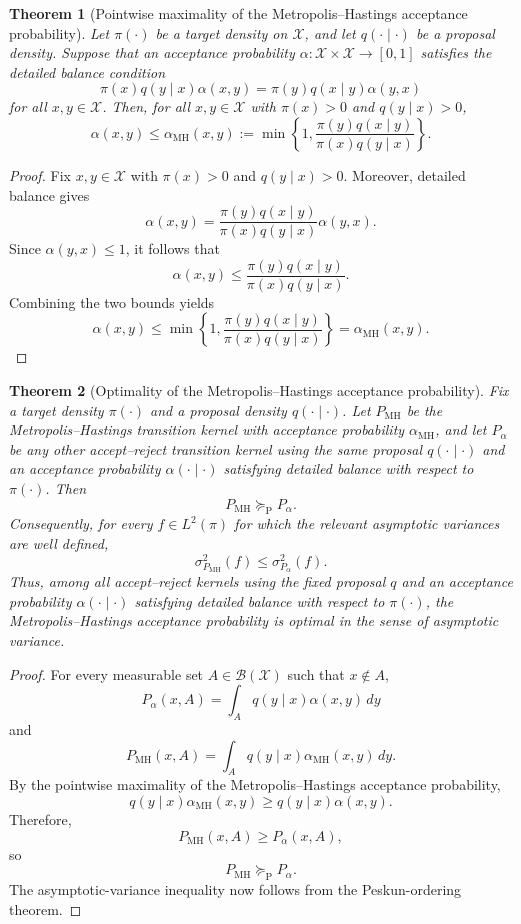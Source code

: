 \documentclass[12pt]{article}
\newtheorem{theorem}{Theorem}[section]
\theoremstyle{definition}
\theoremstyle{remark}
\theoremstyle{plain}
\begin{document}
\begin{theorem}[Pointwise maximality of the Metropolis--Hastings acceptance probability]
Let $\pi(\cdot)$ be a target density on $\mathcal X$, and let $q(\cdot\mid\cdot)$ be a
proposal density. Suppose that an acceptance probability
$\alpha:\mathcal X\times\mathcal X\to[0,1]$ satisfies the detailed balance
condition
\[
\pi(x)q(y\mid x)\alpha(x,y)
=
\pi(y)q(x\mid y)\alpha(y,x)
\]
for all $x,y\in\mathcal X$.
Then, for all $x,y\in\mathcal X$ with $\pi(x)>0$ and $q(y\mid x)>0$,
\[
\alpha(x,y)
\leq
\alpha_{\mathrm{MH}}(x,y)
:=
\min\left\{
1,
\frac{\pi(y)q(x\mid y)}
      {\pi(x)q(y\mid x)}
\right\}.
\]
\end{theorem}

\begin{proof}
Fix $x,y\in\mathcal X$ with $\pi(x)>0$ and $q(y\mid x)>0$.
Moreover, detailed balance gives
\[
\alpha(x,y)
=
\frac{\pi(y)q(x\mid y)}
      {\pi(x)q(y\mid x)}
\alpha(y,x).
\]
Since $\alpha(y,x)\leq 1$, it follows that
\[
\alpha(x,y)
\leq
\frac{\pi(y)q(x\mid y)}
      {\pi(x)q(y\mid x)}.
\]
Combining the two bounds yields
\[
\alpha(x,y)
\leq
\min\left\{
1,
\frac{\pi(y)q(x\mid y)}
      {\pi(x)q(y\mid x)}
\right\}
=
\alpha_{\mathrm{MH}}(x,y).
\]
\end{proof}

\begin{theorem}[Optimality of the Metropolis--Hastings acceptance probability]
Fix a target density $\pi(\cdot)$ and a proposal density $q(\cdot\mid\cdot)$. Let
$P_{\mathrm{MH}}$ be the Metropolis--Hastings transition kernel with
acceptance probability $\alpha_{\mathrm{MH}}$, and let $P_{\alpha}$ be
any other accept--reject transition kernel using the
same proposal $q(\cdot\mid\cdot)$ and an acceptance probability $\alpha(\cdot\mid\cdot)$ satisfying
detailed balance with respect to $\pi(\cdot)$.
Then
\[
P_{\mathrm{MH}}\succeq_{\mathrm P}P_{\alpha}.
\]
Consequently, for every $f\in L^2(\pi)$ for which the relevant
asymptotic variances are well defined,
\[
\sigma_{P_{\mathrm{MH}}}^2(f)
\leq
\sigma_{P_{\alpha}}^2(f).
\]
Thus, among all accept--reject kernels using the fixed
proposal $q$ and an acceptance probability $\alpha(\cdot\mid\cdot)$ 
satisfying detailed balance with respect to $\pi(\cdot)$, the Metropolis--Hastings acceptance
probability is optimal in the sense of asymptotic variance.
\end{theorem}

\begin{proof}
For every measurable set $A\in\mathcal B(\mathcal X)$ such that
$x\notin A$,
\[
P_{\alpha}(x,A)
=
\int_A q(y\mid x)\alpha(x,y)\,dy
\]
and
\[
P_{\mathrm{MH}}(x,A)
=
\int_A q(y\mid x)\alpha_{\mathrm{MH}}(x,y)\,dy.
\]
By the pointwise maximality of the Metropolis--Hastings acceptance
probability,
\[
q(y\mid x)\alpha_{\mathrm{MH}}(x,y)
\geq
q(y\mid x)\alpha(x,y).
\]
Therefore,
\[
P_{\mathrm{MH}}(x,A)
\geq
P_{\alpha}(x,A),
\]
so
\[
P_{\mathrm{MH}}\succeq_{\mathrm P}P_{\alpha}.
\]
The asymptotic-variance inequality now follows from the Peskun-ordering
theorem.
\end{proof}
\end{document}
